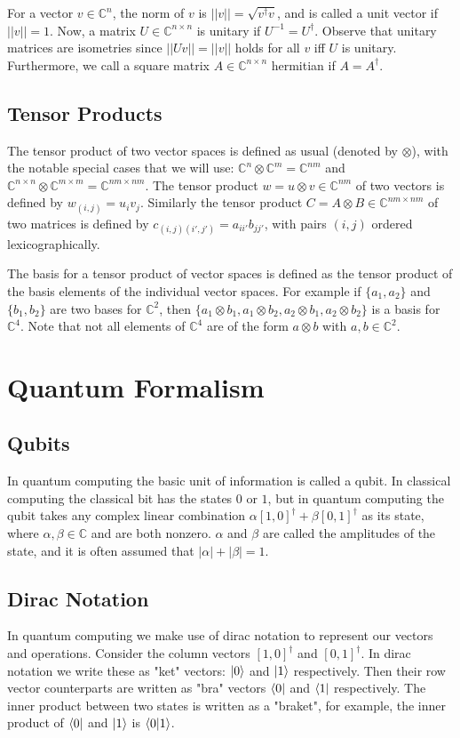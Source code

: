 \documentclass[12pt]{dalthesis}
\begin{document}
For a vector $v \in \mathbb{C}^n$, the norm of $v$ is $||v|| = \sqrt{v^\dag v}$, and is called a unit vector if $||v|| = 1$. Now, a matrix $U \in \mathbb{C}^{n \times n}$ is unitary if $U^{-1} = U^\dag$. Observe that unitary matrices are isometries since $||Uv|| = ||v||$ holds for all $v$ iff $U$ is unitary. Furthermore, we call a square matrix $A \in \mathbb{C}^{n \times n}$ hermitian if $A = A^\dag$. 

\subsection{Tensor Products}
The tensor product of two vector spaces is defined as usual (denoted by $\otimes$), with the notable special cases that we will use: $\mathbb{C}^n \otimes \mathbb{C}^m = \mathbb{C}^{nm}$ and $\mathbb{C}^{n \times n} \otimes \mathbb{C}^{m \times m} = \mathbb{C}^{nm \times nm}$. The tensor product $w = u \otimes v \in \mathbb{C}^{nm}$ of two vectors is defined by $w_{(i, j)} = u_iv_j$. Similarly the tensor product $C = A \otimes B \in \mathbb{C}^{nm \times nm}$ of two matrices is defined by $c_{(i, j)(i', j')} = a_{ii'}b_{jj'}$, with pairs $(i, j)$ ordered lexicographically. 

The basis for a tensor product of vector spaces is defined as the tensor product of the basis elements of the individual vector spaces. For example if $\{ a_1, a_2 \}$ and $\{ b_1 , b_2  \}$ are two bases for $\mathbb{C}^2$, then $\{ a_1 \otimes b_1, a_1 \otimes b_2, a_2 \otimes b_1, a_2 \otimes b_2 \}$ is a basis for $\mathbb{C}^4$. Note that not all elements of $\mathbb{C}^4$ are of the form $a \otimes b$ with $a, b \in \mathbb{C}^2$.


\section{Quantum Formalism}
\subsection{Qubits}
In quantum computing the basic unit of information is called a qubit. In classical computing the classical bit has the states $0$ or $1$, but in quantum computing the qubit takes any complex linear combination $\alpha [1, 0]^\dag + \beta [0, 1]^\dag$ as its state, where $\alpha , \beta \in \mathbb{C}$ and are both nonzero. $\alpha$ and $\beta$ are called the amplitudes of the state, and it is often assumed that $|\alpha | + |\beta | = 1$.

\subsection{Dirac Notation}
In quantum computing we make use of dirac notation to represent our vectors and operations. Consider the column vectors $[1, 0]^\dag$ and $[0, 1]^\dag$. In dirac notation we write these as "ket" vectors: $\ket{0}$ and $\ket{1}$ respectively. Then their row vector counterparts are written as "bra" vectors $\bra{0}$ and $\bra{1}$ respectively. The inner product between two states is written as a "braket", for example, the inner product of $\bra{0}$ and $\ket{1}$ is $\braket{0|1}$.
\end{document}
